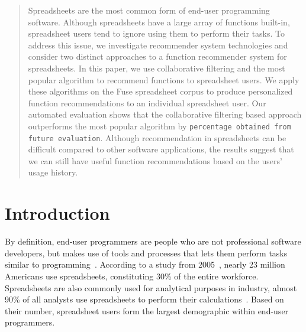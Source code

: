 \documentclass[conference]{IEEEtran}
\begin{document}
\begin{abstract}
Spreadsheets are the most common form of end-user programming software. Although spreadsheets have a large array of functions built-in, spreadsheet users tend to ignore using them to perform their tasks. To address this issue, we investigate recommender system technologies and consider two distinct approaches to a function recommender system for spreadsheets. In this paper, we use collaborative filtering and the most popular algorithm to recommend functions to spreadsheet users. We apply these algorithms on the Fuse spreadsheet corpus to produce personalized function recommendations to an individual spreadsheet user. Our automated evaluation shows that the collaborative filtering based approach outperforms the most popular algorithm by \texttt{percentage obtained from future evaluation}. Although recommendation in spreadsheets can be difficult compared to other software applications, the results suggest that we can still have useful function recommendations based on the users' usage history.
\end{abstract}


%
\IEEEpeerreviewmaketitle

\section{Introduction}

By definition, end-user programmers are people who are not professional software developers, but makes use of tools and processes that lets them perform tasks similar to programming~\cite{ko2011state}. According to a study from 2005~\cite{scaffidi2005estimating}, nearly 23 million Americans use spreadsheets, constituting 30\% of the entire workforce. Spreadsheets are also commonly used for analytical purposes in industry, almost 90\% of all analysts use spreadsheets to perform their calculations~\cite{winston2001executive}. Based on their number, spreadsheet users form the largest demographic within end-user programmers.
\end{document}
